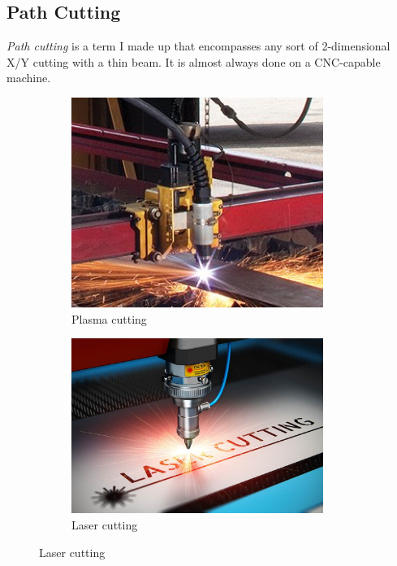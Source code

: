 \documentclass[10pt,letterpaper]{book}
\begin{document}
 
 \subsection{Path Cutting}
 
 \textit{Path cutting} is a term I made up that encompasses any sort of 2-dimensional X/Y cutting with a thin beam. It is almost always done on a CNC-capable machine.
 
 \begin{figure}[H]
		\begin{subfigure}[b]{.24\linewidth}
			\includegraphics[width=0.9\textwidth]{imgs/plasmacut.jpeg}
			\caption{Plasma cutting}
		\end{subfigure}\begin{subfigure}[b]{.24\linewidth}
			\includegraphics[width=0.9\textwidth]{imgs/lasercut.jpeg}
			\caption{Laser cutting}

\end{subfigure}
\end{figure}
\end{document}

